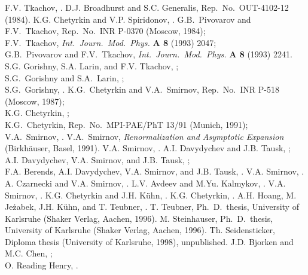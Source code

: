   F.V. Tkachov, .
 D.J. Broadhurst and S.C. Generalis, 
  Rep.~No.~OUT-4102-12 (1984).
  K.G. Chetyrkin and V.P. Spiridonov, .
  G.B.~Pivovarov and F.V.~Tkachov,
  Rep.~No.~INR P-0370 (Moscow, 1984); \\
  F.V.~Tkachov, {\it Int.\ Journ.\ Mod.\ Phys.} {\bf A 8} (1993) 2047; \\
  G.B.~Pivovarov and F.V.~Tkachov,  {\it Int.\ Journ.\ Mod.\ Phys.} {\bf A 8}
  (1993) 2241.
  S.G. Gorishny, S.A. Larin, and F.V. Tkachov, ;\\
  S.G.~Gorishny and S.A.~Larin,
  ;\\
  S.G.~Gorishny, .
  K.G.~Chetyrkin and V.A.~Smirnov,
  Rep.~No.~INR P-518 (Moscow, 1987); \\
  K.G. Chetyrkin, ;\\
  K.G.~Chetyrkin, Rep.~No.~MPI-PAE/PhT 13/91 (Munich, 1991); \\
  V.A.~Smirnov, .
 V.A.~Smirnov, {\it Renormalization and Asymptotic
    Expansion} (Birkh\"auser, Basel, 1991).
  V.A. Smirnov, .
  A.I. Davydychev and J.B. Tausk, ;\\
  A.I. Davydychev, V.A. Smirnov, and J.B. Tausk, ;\\
  F.A. Berends, A.I. Davydychev, V.A. Smirnov, and J.B. Tausk,
  .
  V.A. Smirnov, .
  A. Czarnecki and V.A. Smirnov, .
  L.V. Avdeev and M.Yu. Kalmykov, .
  V.A. Smirnov, .
  K.G. Chetyrkin and J.H. K\"uhn, .
  K.G. Chetyrkin, .
  A.H. Hoang, M. Je\.zabek, J.H. K\"uhn, and T. Teubner, .
 T. Teubner, Ph.~D.~thesis, University of Karlsruhe
  (Shaker Verlag, Aachen, 1996).
  M. Steinhauser, Ph.~D.~thesis, University of Karlsruhe
  (Shaker Verlag, Aachen, 1996).
 Th. Seidensticker, Diploma thesis (University of
  Karlsruhe, 1998), unpublished.
  J.D. Bjorken and M.C. Chen, ;\\
  O. Reading Henry, .
